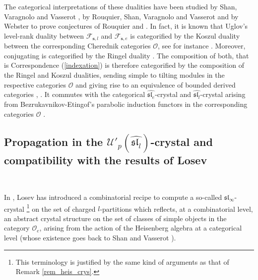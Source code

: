 \documentclass[twoside,12pt]{amsart}
\theoremstyle{plain}
\newcommand{\fl}{\mathfrak{l}}
\newcommand{\fs}{\mathfrak{s}}
\newcommand{\cF}{\mathcal{F}}
\newcommand{\cO}{\mathcal{O}}
\newcommand{\bs}{\mathbf{s}}
\newcommand{\dbs}{\dot{\bs}}
\newcommand{\Ul}{\mathcal{U}'_p (\widehat{\mathfrak{sl}_l})}
\newcommand{\sle}{\widehat{\mathfrak{sl}_e}}
\newcommand{\sll}{\widehat{\mathfrak{sl}_l}}
\theoremstyle{remark}
\begin{document}
The categorical interpretations of these dualities have been studied by Shan, Varagnolo and Vasserot \cite{ShanVaragnoloVasserot2014a}, 
by Rouquier, Shan, Varagnolo and Vasserot \cite{RSVV2016}
and by Webster \cite{Webster2013a} to prove conjectures of Rouquier \cite{Rouquier2008} and \cite{ChuangMiyachi2011}.
In fact, it is known that Uglov's level-rank duality between $\cF_{\bs,l}$ and $\cF_{\dbs,e}$ is categorified by
the Koszul duality between the corresponding Cherednik categories $\cO$, see for instance \cite[Section 6]{Webster2013a}.
Moreover, conjugating is categorified by the Ringel duality \cite[Section 6.2.2]{RSVV2016}.
The composition of both, that is Correspondence (\ref{indexation}) is therefore categorified by the composition of the Ringel and Koszul dualities,
sending simple to tilting modules in the respective categories $\cO$ and
giving rise to an equivalence of bounded derived categories \cite[Conjecture 6]{ChuangMiyachi2011}, \cite[Theorem 7.4]{RSVV2016}.
It commutes with the categorical $\sle$-crystal and $\sll$-crystal arising from Bezrukavnikov-Etingof's parabolic induction functors in the corresponding categories $\cO$ \cite{Shan2011}.





\subsection{Propagation in the $\Ul$-crystal and compatibility with the results of Losev}\label{cher_losev}\

In \cite{Losev2015}, Losev has introduced a combinatorial recipe to compute a so-called $\fs\fl_\infty$-crystal
\footnote{This terminology is justified by the same kind of arguments as that of Remark \ref{rem_heis_crys}.}
on the set of charged $l$-partitions which reflects, at a combinatorial level, an abstract crystal structure on the set of classes of simple objects
in the category $\cO_e$, arising from the action of the Heisenberg algebra at a categorical level
(whose existence goes back to Shan and Vasserot \cite{ShanVasserot2012}).
\end{document}
